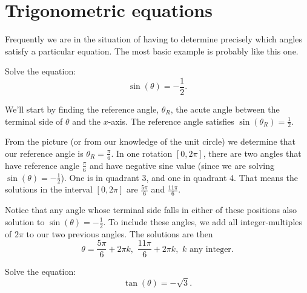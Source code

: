 \documentclass{ximera}
\begin{document}
\section{Trigonometric equations}
Frequently we are in the situation of having to determine precisely which angles satisfy a particular equation.  The most basic example is probably like this one.
\begin{example}
	Solve the equation: \[ \sin(\theta) = -\frac{1}{2}. \]
	\begin{explanation}
		We'll start by finding the reference angle, $\theta_R$, the acute angle between the terminal side of $\theta$ and the $x$-axis.  
		The reference angle satisfies $\sin(\theta_R) = \frac{1}{2}$.  
		\begin{image}[2in]
		\end{image}
		From the picture (or from our knowledge of the unit circle) we determine that our reference angle is $\theta_R = \frac{\pi}{6}$.  In one rotation $[0, 2\pi]$, there are two angles that have reference angle $\frac{\pi}{6}$ and have negative
		sine value (since we are solving $\sin(\theta) = -\frac{1}{2}$).  One is in quadrant 3, and one in quadrant 4.  That means the solutions in the interval $[0, 2\pi]$ are $\frac{5\pi}{6}$ and $\frac{11\pi}{6}$.
		
		Notice that any angle whose terminal side falls in either of these positions also solution to $\sin(\theta) = -\frac{1}{2}$. To include these angles, we add all integer-multiples of $2\pi$ to our two previous angles.
		 The solutions are then \[ \theta = \frac{5\pi}{6} + 2\pi k , \,\, \frac{11\pi}{6}+2\pi k , \,\, k \textrm{ any integer}. \]
	\end{explanation}
\end{example}

\begin{problem}
	Solve the equation: \[ \tan(\theta) = -\sqrt{3}. \]
	\begin{multipleChoice}
	\end{multipleChoice}
\end{problem}
\end{document}
